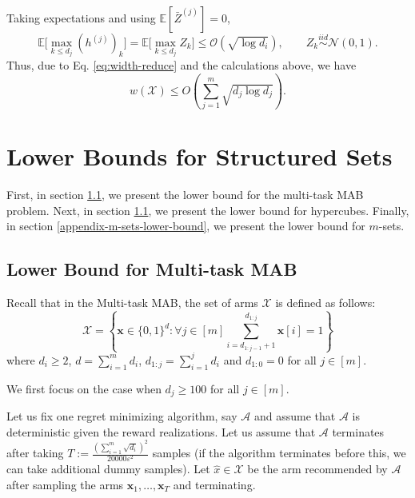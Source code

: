 Taking expectations and using \(\mathbb E[\bar Z^{(j)}]=0\),
\begin{equation}\label{eq:max-equality}
\mathbb E\Big[\max_{k\le d_j} (h^{(j)})_k\Big]
=
\mathbb E\Big[\max_{k\le d_j} Z_k\Big]\leq \mathcal{O}(\sqrt{\log d_i}),
\qquad Z_k\stackrel{iid}{\sim}\mathcal N(0,1).\nonumber
\end{equation}
Thus, due to Eq. \eqref{eq:width-reduce} and the calculations above, we have
\begin{equation}\label{eq:width-final}
w(\mathcal{X})\leq O\left(\sum_{j=1}^m \sqrt{d_j\log d_j}\right).\nonumber
\end{equation}

\section{Lower Bounds for Structured Sets}\label{appendix-structured-sets-lower-bound}
First, in section \ref{appendix-multi-task-lower bound}, we present the lower bound for the multi-task MAB problem. Next, in section \ref{appendix-multi-task-lower bound}, we present the lower bound for hypercubes. Finally, in section \ref{appendix-m-sets-lower-bound}, we present the lower bound for $m$-sets.
\subsection{Lower Bound for Multi-task MAB}\label{appendix-multi-task-lower bound}



Recall that in the Multi-task MAB, the set of arms $\mathcal{X}$ is defined as follows: 
\begin{equation*}
    \mathcal{X}=\left\{\mathbf{x}\in \{0,1\}^d: \forall j\in [m] \sum_{i=d_{1:j-1}+1}^{d_{1:j}} \mathbf{x}[i]=1\right\}
\end{equation*}
where $d_i\geq 2$, $d=\sum_{i=1}^md_i$, $d_{1:j}=\sum_{i=1}^jd_i$ and $d_{1:0}=0$ for all $j\in [m]$.

We first focus on the case when $d_j\geq 100$ for all $j\in[m]$.

Let us fix one regret minimizing algorithm, say $\mathcal{A}$ and assume that $\mathcal{A}$ is deterministic given the reward realizations. Let us assume that $\mathcal{A}$ terminates after taking $T:=\frac{(\sum_{i=1}^m\sqrt{d_i})^2}{20000\varepsilon^2}$ samples (if the algorithm terminates before this, we can take additional dummy samples). Let $\widehat{x}\in \mathcal{X}$ be the arm recommended by $\mathcal{A}$ after sampling the arms $\mathbf{x}_1,\ldots,\mathbf{x}_T$ and terminating. 

